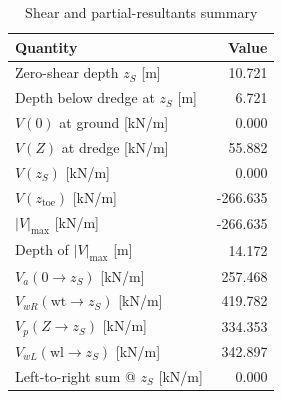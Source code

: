 \begin{table}[H]
  \centering
  \caption{Shear and partial-resultants summary}
  \label{tab:shear_summary_zs_caseB}
  \small
  \setlength{\tabcolsep}{10pt}
  \renewcommand{\arraystretch}{1.15}
  \begin{tabular}{@{}l r@{}}
    \toprule
    Quantity & Value \\
    \midrule
    Zero-shear depth $z_S$ [m] & 10.721 \\
    Depth below dredge at $z_S$ [m] & 6.721 \\
    $V(0)$ at ground [kN/m] & 0.000 \\
    $V(Z)$ at dredge [kN/m] & 55.882 \\
    $V(z_S)$ [kN/m] & 0.000 \\
    $V(z_{\text{toe}})$ [kN/m] & -266.635 \\
    $|V|_{\max}$ [kN/m] & -266.635 \\
    Depth of $|V|_{\max}$ [m] & 14.172 \\
    $V_a(0\to z_S)$ [kN/m] & 257.468 \\
    $V_{wR}(\text{wt}\to z_S)$ [kN/m] & 419.782 \\
    $V_p(Z\to z_S)$ [kN/m] & 334.353 \\
    $V_{wL}(\text{wl}\to z_S)$ [kN/m] & 342.897 \\
    Left-to-right sum @ $z_S$ [kN/m] & 0.000 \\
    \bottomrule
  \end{tabular}
\end{table}






